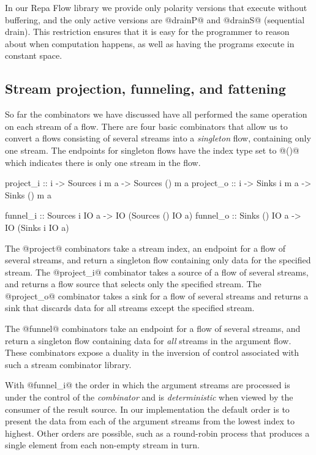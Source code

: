 In our Repa Flow library we provide only polarity versions that execute without buffering, and the only active versions are @drainP@ and @drainS@ (sequential drain). This restriction ensures that it is easy for the programmer to reason about when computation happens, as well as having the programs execute in constant space.


\subsection{Stream projection, funneling, and fattening}
So far the combinators we have discussed have all performed the same operation on each stream of a flow. There are four basic combinators that allow us to convert a flows consisting of several streams into a \emph{singleton} flow, containing only one stream. The endpoints for singleton flows have the index type set to @()@ which indicates there is only one stream in the flow.
\begin{code}
project_i :: i -> Sources i m a -> Sources () m a
project_o :: i -> Sinks   i m a -> Sinks   () m a

funnel_i  :: Sources i IO a -> IO (Sources () IO a)
funnel_o  :: Sinks  () IO a -> IO (Sinks   i  IO a)
\end{code}

The @project@ combinators take a stream index, an endpoint for a flow of several streams, and return a singleton flow containing only data for the specified stream. The @project_i@ combinator takes a source of a flow of several streams, and returns a flow source that selects only the specified stream. The @project_o@ combinator takes a sink for a flow of several streams and returns a sink that discards data for all streams except the specified stream.

The @funnel@ combinators take an endpoint for a flow of several streams, and return a singleton flow containing data for \emph{all} streams in the argument flow. These combinators expose a duality in the inversion of control associated with such a stream combinator library. 

With @funnel_i@ the order in which the argument streams are processed is under the control of the \emph{combinator} and is \emph{deterministic} when viewed by the consumer of the result source. In our implementation the default order is to present the data from each of the argument streams from the lowest index to highest. Other orders are possible, such as a round-robin process that produces a single element from each non-empty stream in turn. 

